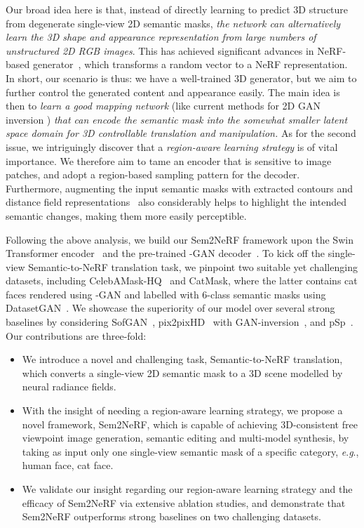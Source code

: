 \documentclass[runningheads]{llncs}
\newcommand{\eg}{\textit{e}.\textit{g}.}
\begin{document}
Our broad idea here is that, instead of directly learning to predict 3D structure from degenerate single-view 2D semantic masks, \emph{the network can alternatively learn the 3D shape and appearance representation from large numbers of unstructured 2D RGB images}. This has achieved significant advances in NeRF-based generator~\cite{schwarz2020graf,niemeyer2021giraffe,chan2021pi,gu2021stylenerf,chan2021efficient}, which transforms a random vector to a NeRF representation. In short, our scenario is thus: we have a well-trained 3D generator, but we aim to further control the generated content and appearance easily. The main idea is then to \emph{learn a good mapping network} (like current methods for 2D GAN inversion \cite{richardson2021encoding,song2021agilegan}) \emph{that can encode the semantic mask into the somewhat smaller latent space domain for 3D controllable translation and manipulation.} As for the second issue, we intriguingly discover that a \emph{region-aware learning strategy} is of vital importance. We therefore aim to tame an encoder that is sensitive to image patches, and adopt a region-based sampling pattern for the decoder. Furthermore, augmenting the input semantic masks with extracted contours and distance field representations~\cite{chen2018sketchygan} also considerably helps to highlight the intended semantic changes, making them more easily perceptible.
    

Following the above analysis, we build our Sem2NeRF framework upon the Swin Transformer encoder~\cite{liu2021swin} and the pre-trained -GAN decoder~\cite{chan2021pi}. To kick off the single-view Semantic-to-NeRF translation task, we pinpoint two suitable yet challenging datasets, including CelebAMask-HQ~\cite{lee2020maskgan} and CatMask, where the latter contains cat faces rendered using -GAN and labelled with 6-class semantic masks using DatasetGAN~\cite{zhang2021datasetgan}. We showcase the superiority of our model over several strong baselines by considering SofGAN~\cite{chen2022sofgan}, pix2pixHD~\cite{wang2018high} with GAN-inversion~\cite{karras2020analyzing}, and pSp~\cite{richardson2021encoding}. 
Our contributions are three-fold:
\begin{itemize}
  \item We introduce a novel and challenging task, Semantic-to-NeRF translation, which converts a single-view 2D semantic mask to a 3D scene modelled by neural radiance fields.
  \item With the insight of needing a region-aware learning strategy, we propose a novel framework, Sem2NeRF, which is capable of achieving 3D-consistent free viewpoint image generation, semantic editing and multi-model synthesis, by taking as input only one single-view semantic mask of a specific category, \eg, human face, cat face.
  \item We validate our insight regarding our region-aware learning strategy and the efficacy of Sem2NeRF via extensive ablation studies, and demonstrate that Sem2NeRF outperforms strong baselines on two challenging datasets. 
\end{itemize}
\end{document}
